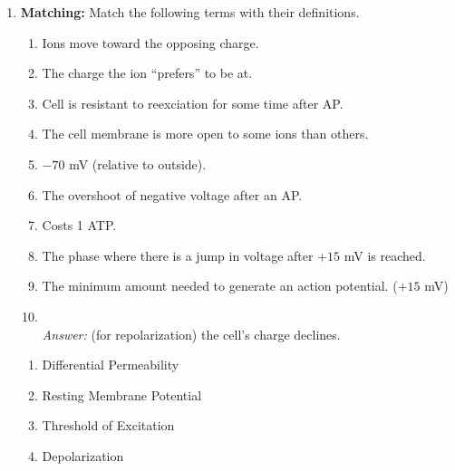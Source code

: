 \begin{enumerate}[label=\textbf{Q2.3.\arabic*}]
      \item \textbf{Matching:} Match the following terms with their definitions.
            \begin{wordbox}
                  \begin{enumerate}
                        \item Ions move toward the opposing charge.
                        \item The charge the ion ``prefers'' to be at.
                        \item Cell is resistant to reexciation for some time after AP.
                        \item The cell membrane is more open to some ions than others.
                        \item \(-70\) mV (relative to outside).
                        \item The overshoot of negative voltage after an AP.
                        \item Costs 1 ATP. 
                        \item The phase where there is a jump in voltage after \(+15\) mV is reached.
                        \item The minimum amount needed to generate an action potential. (\(+15\) mV)
                        \item \underline{\hspace{10cm}} \\
                        \textit{Answer:} (for repolarization) the cell's charge declines. 
                  \end{enumerate}
            \end{wordbox}
            \begin{enumerate}[label=(\arabic*)]
                  \item Differential Permeability \quad \dotfill \quad \underline{\hspace{1cm}} \\
                  \item Resting Membrane Potential \quad \dotfill \quad \underline{\hspace{1cm}}\\
                  \item Threshold of Excitation \quad \dotfill \quad \underline{\hspace{1cm}}\\
                  \item Depolarization \quad \dotfill \quad \underline{\hspace{1cm}}\\

\end{enumerate}
\end{enumerate}
